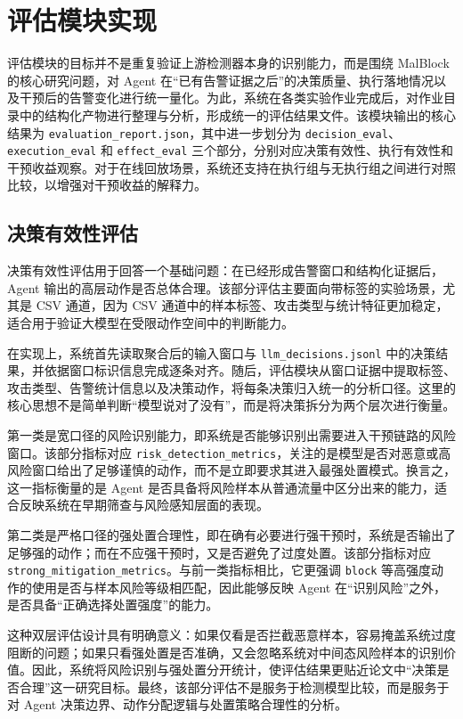 \section{评估模块实现}\label{sec:evaluation_module}

评估模块的目标并不是重复验证上游检测器本身的识别能力，而是围绕 MalBlock 的核心研究问题，对 Agent 在``已有告警证据之后''的决策质量、执行落地情况以及干预后的告警变化进行统一量化。为此，系统在各类实验作业完成后，对作业目录中的结构化产物进行整理与分析，形成统一的评估结果文件。该模块输出的核心结果为 \texttt{evaluation\_report.json}，其中进一步划分为 \texttt{decision\_eval}、\texttt{execution\_eval} 和 \texttt{effect\_eval} 三个部分，分别对应决策有效性、执行有效性和干预收益观察。对于在线回放场景，系统还支持在执行组与无执行组之间进行对照比较，以增强对干预收益的解释力。

\subsection{决策有效性评估}\label{subsec:evaluation_decision}

决策有效性评估用于回答一个基础问题：在已经形成告警窗口和结构化证据后，Agent 输出的高层动作是否总体合理。该部分评估主要面向带标签的实验场景，尤其是 CSV 通道，因为 CSV 通道中的样本标签、攻击类型与统计特征更加稳定，适合用于验证大模型在受限动作空间中的判断能力。

在实现上，系统首先读取聚合后的输入窗口与 \texttt{llm\_decisions.jsonl} 中的决策结果，并依据窗口标识信息完成逐条对齐。随后，评估模块从窗口证据中提取标签、攻击类型、告警统计信息以及决策动作，将每条决策归入统一的分析口径。这里的核心思想不是简单判断``模型说对了没有''，而是将决策拆分为两个层次进行衡量。

第一类是宽口径的风险识别能力，即系统是否能够识别出需要进入干预链路的风险窗口。该部分指标对应 \texttt{risk\_detection\_metrics}，关注的是模型是否对恶意或高风险窗口给出了足够谨慎的动作，而不是立即要求其进入最强处置模式。换言之，这一指标衡量的是 Agent 是否具备将风险样本从普通流量中区分出来的能力，适合反映系统在早期筛查与风险感知层面的表现。

第二类是严格口径的强处置合理性，即在确有必要进行强干预时，系统是否输出了足够强的动作；而在不应强干预时，又是否避免了过度处置。该部分指标对应 \texttt{strong\_mitigation\_metrics}。与前一类指标相比，它更强调 \texttt{block} 等高强度动作的使用是否与样本风险等级相匹配，因此能够反映 Agent 在``识别风险''之外，是否具备``正确选择处置强度''的能力。

这种双层评估设计具有明确意义：如果仅看是否拦截恶意样本，容易掩盖系统过度阻断的问题；如果只看强处置是否准确，又会忽略系统对中间态风险样本的识别价值。因此，系统将风险识别与强处置分开统计，使评估结果更贴近论文中``决策是否合理''这一研究目标。最终，该部分评估不是服务于检测模型比较，而是服务于对 Agent 决策边界、动作分配逻辑与处置策略合理性的分析。

